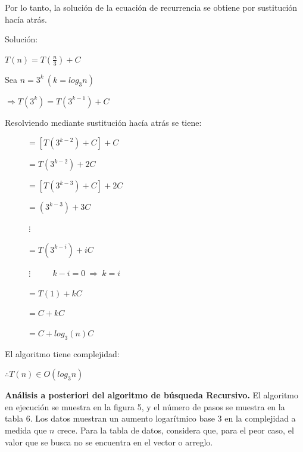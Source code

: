 \documentclass[12pt,twoside]{article}
\begin{document}
\newpage
Por lo tanto, la solución de la ecuación de recurrencia se obtiene por sustitución hacía atrás. 
  
Solución:


  $T(n)=T(\frac{n}{3})+C$

  Sea $n=3^k\ (k=log_3 n)$
  
  $\Rightarrow T(3^k)=T(3^{k-1})+C$
  \par
  Resolviendo mediante sustitución hacía atrás se tiene:

  $\ \ \ \ \ \ \ \ \ \ \ \ =[T(3^{k-2})+C]+C$

  $\ \ \ \ \ \ \ \ \ \ \ \ =T(3^{k-2})+2C$

  $\ \ \ \ \ \ \ \ \ \ \ \ =[T(3^{k-3})+C]+2C$

  $\ \ \ \ \ \ \ \ \ \ \ \ =(3^{k-3})+3C$

  $\ \ \ \ \ \ \ \ \ \ \ \ \ \vdots$

  $\ \ \ \ \ \ \ \ \ \ \ \ =T(3^{k-i})+iC$

  $\ \ \ \ \ \ \ \ \ \ \ \ \ \vdots \ \ \ \ \ \ \ \  \ \ \ \ k-i=0\ \Rightarrow \ k=i$
  

  $\ \ \ \ \ \ \ \ \ \ \ \ =T(1)+kC$

  $\ \ \ \ \ \ \ \ \ \ \ \ =C+kC$

  $\ \ \ \ \ \ \ \ \ \ \ \ =C+log_3(n)C$

  \medskip

  El algoritmo tiene complejidad:
\begin{center}
  $\therefore T(n)\in O(log_3n)$ 
\end{center}


\newpage
\textbf{Análisis a posteriori del algoritmo de búsqueda Recursivo.}
El algoritmo en ejecución se muestra en la figura 5, y el número de pasos se muestra en la tabla 6. Los datos muestran un aumento logarítmico base 3 en la complejidad a medida que $n$ crece. Para la tabla de datos, considera que, para el peor caso, el valor que se busca no se encuentra en el vector o arreglo.
\par
\end{document}
